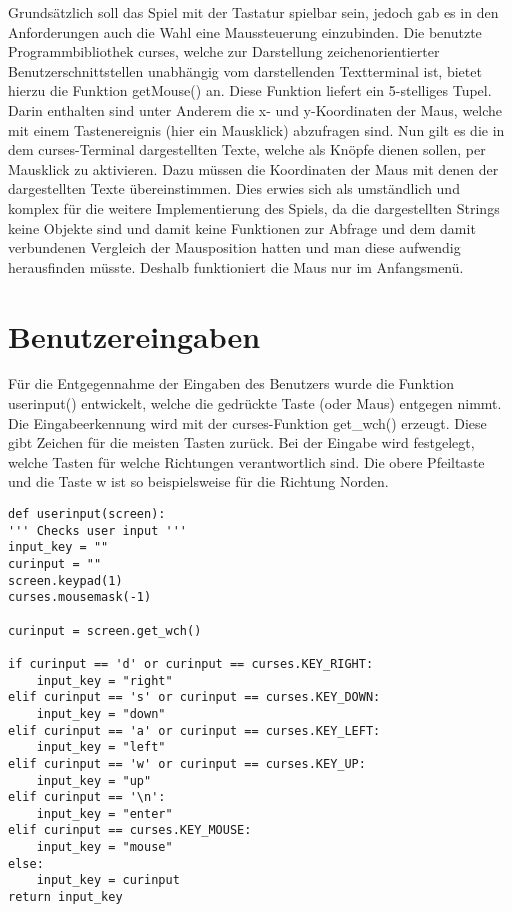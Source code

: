 \documentclass{llncs}
\begin{document}
Grundsätzlich soll das Spiel mit der Tastatur spielbar sein, jedoch gab es in den Anforderungen auch die Wahl eine Maussteuerung einzubinden.
Die benutzte Programmbibliothek \glqq curses\grqq{}, welche zur Darstellung zeichenorientierter Benutzerschnittstellen unabhängig vom darstellenden Textterminal ist,
bietet hierzu die Funktion \glqq getMouse()\grqq{} an. Diese Funktion liefert ein 5-stelliges Tupel. Darin enthalten sind unter Anderem die x- und y-Koordinaten der Maus,
welche mit einem Tastenereignis (hier ein Mausklick) abzufragen sind. Nun gilt es die in dem curses-Terminal dargestellten Texte, welche als Knöpfe dienen sollen,
per Mausklick zu aktivieren. Dazu müssen die Koordinaten der Maus mit denen der dargestellten Texte übereinstimmen. Dies erwies sich als umständlich und komplex für die
weitere Implementierung des Spiels, da die dargestellten Strings keine Objekte sind und damit keine Funktionen zur Abfrage und dem damit verbundenen Vergleich der Mausposition hatten und man diese aufwendig herausfinden müsste.
Deshalb funktioniert die Maus nur im Anfangsmenü.

\section{Benutzereingaben}

Für die Entgegennahme der Eingaben des Benutzers wurde die Funktion \glqq userinput()\grqq{} entwickelt, welche die gedrückte Taste (oder Maus) entgegen nimmt.
Die Eingabeerkennung wird mit der curses-Funktion \glqq get\_wch()\grqq{} erzeugt. Diese gibt Zeichen für die meisten Tasten zurück.
Bei der Eingabe wird festgelegt, welche Tasten für welche Richtungen verantwortlich sind. Die obere Pfeiltaste und die Taste \glqq w\grqq{} ist so beispielsweise für die Richtung Norden.

\lstset{
caption=Funktion userinput() nimmt Eingaben des Benutzers an}
\begin{lstlisting}
def userinput(screen):
''' Checks user input '''
input_key = ""
curinput = ""
screen.keypad(1)
curses.mousemask(-1)

curinput = screen.get_wch()

if curinput == 'd' or curinput == curses.KEY_RIGHT:
    input_key = "right"
elif curinput == 's' or curinput == curses.KEY_DOWN:
    input_key = "down"
elif curinput == 'a' or curinput == curses.KEY_LEFT:
    input_key = "left"
elif curinput == 'w' or curinput == curses.KEY_UP:
    input_key = "up"
elif curinput == '\n':
    input_key = "enter"
elif curinput == curses.KEY_MOUSE:
    input_key = "mouse"
else: 
    input_key = curinput
return input_key
\end{lstlisting}
\end{document}
